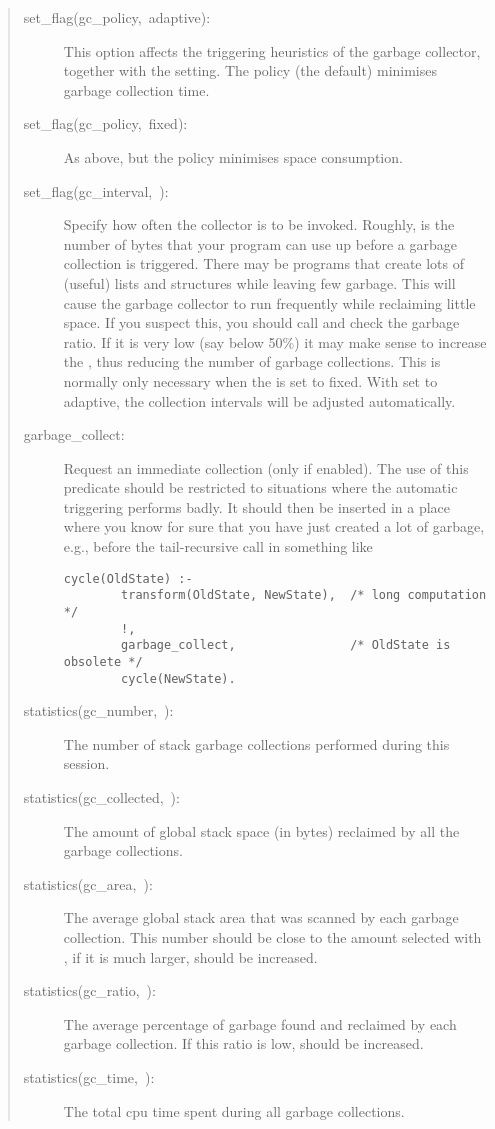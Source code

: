 \begin{quote}
\begin{description}
\item [set_flag(gc_policy,~adaptive):]
	This option affects the triggering heuristics of the garbage
	collector, together with the  setting.
	The  policy (the default) minimises garbage
        collection time.
\item [set_flag(gc_policy,~fixed):] As above, but the  policy
        minimises space consumption.
\item [set_flag(gc_interval,~):]
	Specify how often the collector is to be invoked. Roughly,
	is the number of bytes that your program can use up before
	a garbage collection is triggered.
	There may be programs that create lots of (useful) lists and
	structures while leaving few garbage. This will cause the garbage
	collector to run frequently while reclaiming little space.
	If you suspect this, you should call  and check
	the garbage ratio. If it is very low (say below 50\%) it may
	make sense to increase the , thus reducing
	the number of garbage collections.  This is normally only
	necessary when the  is set to fixed.  With
	set to adaptive, the collection intervals will be adjusted
	automatically.
\item [garbage_collect:]
	Request an immediate collection (only if enabled). The use of this
	predicate should be restricted to situations where the automatic
	triggering performs badly. It should then be inserted in a place
	where you know for sure that you have just created a lot of garbage,
	e.g., before the tail-recursive call in something like
\begin{verbatim}
cycle(OldState) :-
        transform(OldState, NewState),  /* long computation     */
        !,
        garbage_collect,                /* OldState is obsolete */
        cycle(NewState).
\end{verbatim}
\item [statistics(gc_number,~):]
	The number of stack garbage collections performed during this {\eclipse}
        session.
\item [statistics(gc_collected,~):]
	The amount of global stack space (in bytes) reclaimed by all the
	garbage collections.
\item [statistics(gc_area,~):]
	The average global stack area that was scanned by each garbage
	collection. This number should be close to the amount selected with
	, if it is much larger, 
	should be increased.
\item [statistics(gc_ratio,~):]
	The average percentage of garbage found and reclaimed by each
	garbage collection.
	If this ratio is low,  should be increased.
\item [statistics(gc_time,~):]
	The total cpu time spent during all garbage collections.
\end{description}
\end{quote}

